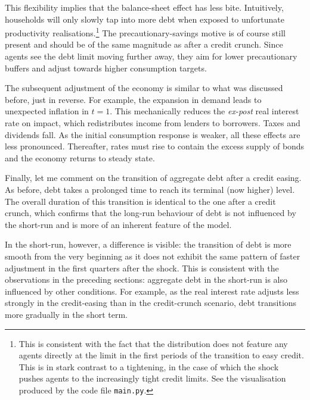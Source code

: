 \documentclass[a4paper,12pt]{article} %
\numberwithin{equation}{section} %
\numberwithin{figure}{section}
\numberwithin{table}{section}
\begin{document}
This flexibility implies that the balance-sheet effect has less bite. Intuitively, households will only slowly tap into more debt when exposed to  unfortunate productivity realisations.\footnote{This is consistent with the fact that the distribution does not feature any agents directly at the limit in the first periods of the transition to easy credit. This is in stark contrast to a tightening, in the case of which the shock pushes agents to the increasingly tight credit limits. See the visualisation produced by the code file \texttt{main.py}.} The precautionary-savings motive is of course still present and should be of the same magnitude as after a credit crunch. Since agents see the debt limit moving further away, they aim for lower precautionary buffers and adjust towards higher consumption targets. 

The subsequent adjustment of the economy is similar to what was discussed before, just in reverse. For example, the expansion in demand leads to unexpected inflation in $t=1$. This mechanically reduces the \textit{ex-post} real interest rate on impact, which redistributes income from lenders to borrowers. Taxes and dividends fall. As the initial consumption response is weaker, all these effects are less pronounced. Thereafter, rates must rise to contain the excess supply of bonds and the economy returns to steady state.

Finally, let me comment on the transition of aggregate debt after a credit easing. As before, debt takes a prolonged time to reach its terminal (now higher) level. The overall duration of this transition is identical to the one after a credit crunch, which confirms that the long-run behaviour of debt is not influenced by the short-run and is more of an inherent feature of the model.

In the short-run, however, a difference is visible: the transition of debt is more smooth from the very beginning as it does not exhibit the same pattern of faster adjustment in the first quarters after the shock. This is consistent with the observations in the preceding sections: aggregate debt in the short-run is also influenced by other conditions. For example, as the real interest rate adjusts less strongly in the credit-easing than in the credit-crunch scenario, debt transitions more gradually in the short term.

\end{document}
